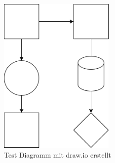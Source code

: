 \documentclass{book}
\begin{document}
\begin{figure}[h]
  \centering
  \includegraphics[width=0.5\textwidth]{diagram.png}
  \caption{Test Diagramm mit draw.io erstellt}
  \label{fig:diagram}
\end{figure}
\end{document}
